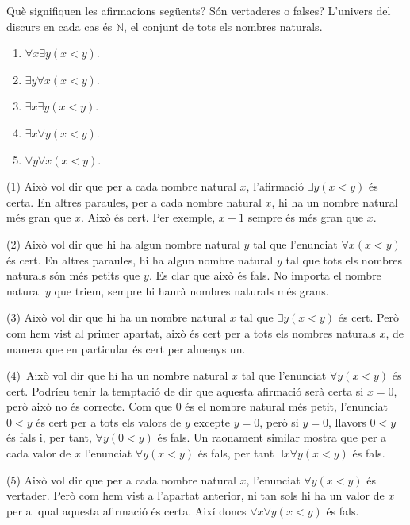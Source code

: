\begin{exercici}
Què signifiquen les afirmacions següents? Són vertaderes o falses?
L'univers del discurs en cada cas és $\mathbb{N}$, el conjunt de tots els
nombres naturals.

\begin{enumerate}
\item $\forall x\exists y(x<y)$.

\item $\exists y\forall x(x<y)$.

\item $\exists x\exists y(x<y)$.

\item $\exists x\forall y(x<y)$.

\item $\forall y\forall x(x<y)$.
\end{enumerate}
\end{exercici}

\begin{solucio}
(1) Això vol dir que per a cada nombre natural $x$, l'afirmació
$\exists y(x<y)$ és certa. En altres paraules, per a cada nombre natural
$x$, hi ha un nombre natural més gran que $x$. Això és cert. Per
exemple, $x+1$ sempre és més gran que $x$.

(2) Això vol dir que hi ha algun nombre natural $y$ tal que l'enunciat
$\forall x(x<y)$ és cert. En altres paraules, hi ha algun nombre natural
$y$ tal que tots els nombres naturals són més petits que $y$. Es clar
que això és fals. No importa el nombre natural $y$ que triem, sempre
hi haurà nombres naturals més grans.

(3) Això vol dir que hi ha un nombre natural $x$ tal que $\exists y(x<y)$
és cert. Però com hem vist al primer apartat, això és cert per
a tots els nombres naturals $x$, de manera que en particular és cert per
almenys un.

(4)\ Això vol dir que hi ha un nombre natural $x$ tal que l'enunciat
$\forall y(x<y)$ és cert. Podríeu tenir la temptació de dir que
aquesta afirmació serà certa si $x=0$, però això no és
correcte. Com que $0$ és el nombre natural més petit, l'enunciat $0<y
$ és cert per a tots els valors de $y$ excepte $y=0$, però si $y=0$,
llavors $0<y$ és fals i, per tant, $\forall y(0<y)$ és fals. Un
raonament similar mostra que per a cada valor de $x$ l'enunciat $\forall
y(x<y)$ és fals, per tant $\exists x\forall y(x<y)$ és fals.

(5) Això vol dir que per a cada nombre natural $x$, l'enunciat $\forall
y(x<y)$ és vertader. Però com hem vist a l'apartat anterior, ni tan
sols hi ha un valor de $x$ per al qual aquesta afirmació és certa.
Així doncs $\forall x\forall y(x<y)$ és fals.
\end{solucio}

